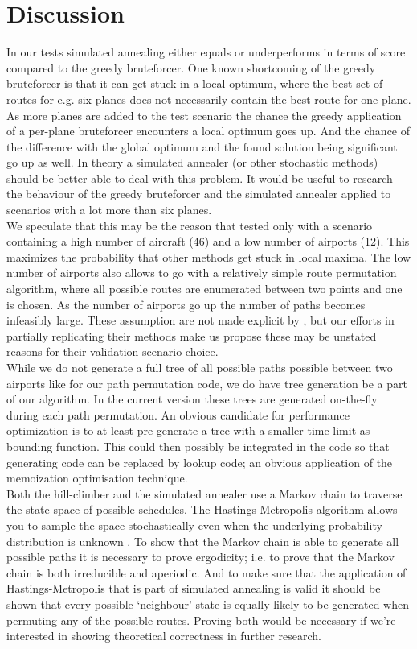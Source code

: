 \documentclass[journal]{IEEEtran}
\begin{document}
\section{Discussion}
In our tests simulated annealing either equals or underperforms in terms of score compared to the greedy bruteforcer. One known shortcoming of the greedy bruteforcer is that it can get stuck in a local optimum, where the best set of routes for e.g. six planes does not necessarily contain the best route for one plane. As more planes are added to the test scenario the chance the greedy application of a per-plane bruteforcer encounters a local optimum goes up. And the chance of the difference with the global optimum and the found solution being significant go up as well. In theory a simulated annealer (or other stochastic methods) should be better able to deal with this problem. It would be useful to research the behaviour of the greedy bruteforcer and the simulated annealer applied to scenarios with a lot more than six planes. \\
We speculate that this may be the reason that \cite{Mashford2001} tested only with a scenario containing a high number of aircraft (46) and a low number of airports (12). This maximizes the probability that other methods get stuck in local maxima. The low number of airports also allows \cite{Mashford2001} to go with a relatively simple route permutation algorithm, where all possible routes are enumerated between two points and one is chosen. As the number of airports go up the number of paths becomes infeasibly large. These assumption are not made explicit by \cite{Mashford2001}, but our efforts in partially replicating their methods make us propose these may be unstated reasons for their validation scenario choice. \\
While we do not generate a full tree of all possible paths possible between two airports like \cite{Mashford2001} for our path permutation code, we do have tree generation be a part of our algorithm. In the current version these trees are generated on-the-fly during each path permutation. An obvious candidate for performance optimization is to at least pre-generate a tree with a smaller time limit as bounding function. This could then possibly be integrated in the code so that generating code can be replaced by lookup code; an obvious application of the memoization optimisation technique. \\
Both the hill-climber and the simulated annealer use a Markov chain to traverse the state space of possible schedules. The Hastings-Metropolis algorithm allows you to sample the space stochastically even when the underlying probability distribution is unknown \cite{Hasting1970}. To show that the Markov chain is able to generate all possible paths it is necessary to prove ergodicity; i.e. to prove that the Markov chain is both irreducible and aperiodic. And to make sure that the application of Hastings-Metropolis that is part of simulated annealing is valid it should be shown that every possible `neighbour' state is equally likely to be generated when permuting any of the possible routes. Proving both would be necessary if we're interested in showing theoretical correctness in further research. \\
\end{document}
